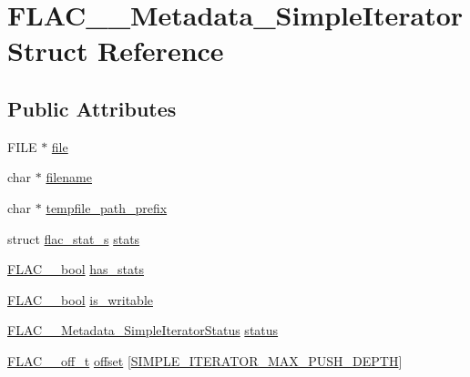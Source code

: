 \hypertarget{struct_f_l_a_c_____metadata___simple_iterator}{}\section{F\+L\+A\+C\+\_\+\+\_\+\+Metadata\+\_\+\+Simple\+Iterator Struct Reference}
\label{struct_f_l_a_c_____metadata___simple_iterator}
\subsection*{Public Attributes}
\begin{DoxyCompactItemize}
\item 
F\+I\+LE $\ast$ \hyperlink{struct_f_l_a_c_____metadata___simple_iterator_a65713de48a50e337d80a8e941a763320}{file}
\item 
char $\ast$ \hyperlink{struct_f_l_a_c_____metadata___simple_iterator_a83f7ccf60b6356c73ede243b1be1d399}{filename}
\item 
char $\ast$ \hyperlink{struct_f_l_a_c_____metadata___simple_iterator_ae27764634ce79fbe48658c8f807b22ac}{tempfile\+\_\+path\+\_\+prefix}
\item 
struct \hyperlink{libflac_2include_2share_2compat_8h_aaaa24bcef3a9b01eabb0912fe63bfe7d}{flac\+\_\+stat\+\_\+s} \hyperlink{struct_f_l_a_c_____metadata___simple_iterator_a678a2d50a0a11618bde6f1a51b49d9ea}{stats}
\item 
\hyperlink{ordinals_8h_a95103469f1cbd78b8cf250194985b34e}{F\+L\+A\+C\+\_\+\+\_\+bool} \hyperlink{struct_f_l_a_c_____metadata___simple_iterator_abd0a18edd7cf23b6ba81b1937330168c}{has\+\_\+stats}
\item 
\hyperlink{ordinals_8h_a95103469f1cbd78b8cf250194985b34e}{F\+L\+A\+C\+\_\+\+\_\+bool} \hyperlink{struct_f_l_a_c_____metadata___simple_iterator_a52c9bc0e98ecbf298ff7f6aa3c2b78d5}{is\+\_\+writable}
\item 
\hyperlink{group__flac__metadata__level1_gac926e7d2773a05066115cac9048bbec9}{F\+L\+A\+C\+\_\+\+\_\+\+Metadata\+\_\+\+Simple\+Iterator\+Status} \hyperlink{struct_f_l_a_c_____metadata___simple_iterator_a4b4d3577a4658b5ab407184343f7ed03}{status}
\item 
\hyperlink{libflac_2include_2share_2compat_8h_a125fb0105eee035da35c6a4999d140eb}{F\+L\+A\+C\+\_\+\+\_\+off\+\_\+t} \hyperlink{struct_f_l_a_c_____metadata___simple_iterator_af4b77f4b4c1f90786a038731f8b45a96}{offset} \mbox{[}\hyperlink{metadata__iterators_8c_a53b73b066f487bca30916ebfc1050165}{S\+I\+M\+P\+L\+E\+\_\+\+I\+T\+E\+R\+A\+T\+O\+R\+\_\+\+M\+A\+X\+\_\+\+P\+U\+S\+H\+\_\+\+D\+E\+P\+TH}\mbox{]}

\end{DoxyCompactItemize}
